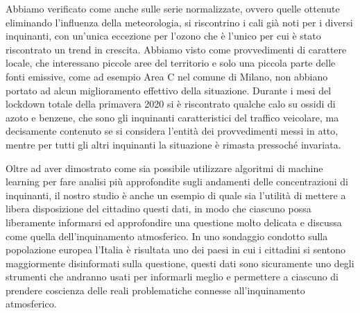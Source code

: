 \documentclass[a4paper]{article}
\begin{document}
Abbiamo verificato come anche sulle serie normalizzate, ovvero quelle ottenute eliminando l'influenza della meteorologia, si riscontrino i cali già noti per i diversi inquinanti, con un'unica eccezione per l'ozono che è l'unico per cui è stato riscontrato un trend in crescita. Abbiamo visto come provvedimenti di carattere locale, che interessano piccole aree del territorio e solo una piccola parte delle fonti emissive, come ad esempio Area C nel comune di Milano, non abbiano portato ad alcun miglioramento effettivo della situazione. Durante i mesi del lockdown totale della primavera 2020 si è riscontrato qualche calo su ossidi di azoto e benzene, che sono gli inquinanti caratteristici del traffico veicolare, ma decisamente contenuto se si considera l'entità dei provvedimenti messi in atto, mentre per tutti gli altri inquinanti la situazione è rimasta pressoché invariata.

Oltre ad aver dimostrato come sia possibile utilizzare algoritmi di machine learning per fare analisi più approfondite sugli andamenti delle concentrazioni di inquinanti, il nostro studio è anche un esempio di quale sia l'utilità di mettere a libera disposizione del cittadino questi dati, in modo che ciascuno possa liberamente informarsi ed approfondire una questione molto delicata e discussa come quella dell'inquinamento atmosferico. In uno sondaggio condotto sulla popolazione europea l'Italia è risultata uno dei paesi in cui i cittadini si sentono maggiormente disinformati sulla questione, questi dati sono sicuramente uno degli strumenti che andranno usati per informarli meglio e permettere a ciascuno di prendere coscienza delle reali problematiche connesse all'inquinamento atmosferico.
\end{document}
